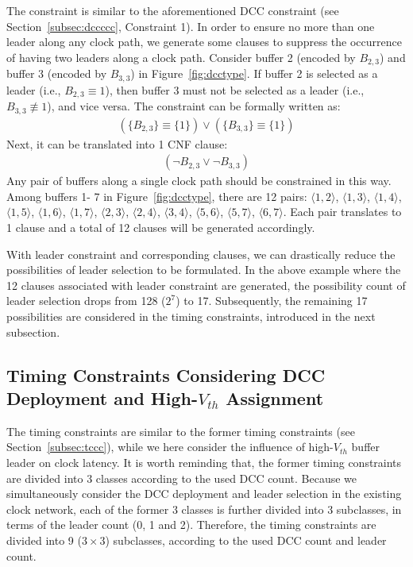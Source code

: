 The constraint is similar to the aforementioned DCC constraint (see Section~\ref{subsec:dccccc}, Constraint 1). In order to ensure no more than one leader along any clock path, we generate some clauses to suppress the occurrence of having two leaders along a clock path. Consider buffer 2 (encoded by {\fontsize{9}{10}$B_{2,3}$}) and buffer 3 (encoded by {\fontsize{9}{10}$B_{3,3}$}) in Figure~\ref{fig:dcctype}. If buffer 2 is selected as a leader (i.e., {\fontsize{9}{10}${B_{2,3}} \equiv {1}$}), then buffer 3 must not be selected as a leader (i.e., {\fontsize{9}{10}$B_{3,3} \not\equiv {1}$}), and vice versa. The constraint can be formally written as:
{\fontsize{9}{10}
\begin{gather*}
\left(\{B_{2,3}\} \equiv \{1\}\right) \lor \left(\{B_{3,3}\} \equiv \{1\}\right)
\end{gather*}}
Next, it can be translated into 1 CNF clause:
{\fontsize{9}{10}
\begin{equation*}
\begin{split}
(\neg B_{2,3}\lor\neg B_{3,3})
\end{split}
\end{equation*}}
Any pair of buffers along a single clock path should be constrained in this way. Among buffers 1- 7 in Figure~\ref{fig:dcctype}, there are 12 pairs: $\langle1, 2\rangle$, $\langle1, 3\rangle$, $\langle1, 4\rangle$, $\langle1, 5\rangle$, $\langle1, 6\rangle$, $\langle1, 7\rangle$, $\langle2, 3\rangle$, $\langle2, 4\rangle$, $\langle3, 4\rangle$, $\langle5, 6\rangle$, $\langle5, 7\rangle$, $\langle6, 7\rangle$. Each pair translates to 1 clause and a total of 12 clauses will be generated accordingly.

With leader constraint and corresponding clauses, we can drastically reduce the possibilities of leader selection to be formulated. In the above example where the 12 clauses associated with leader constraint are generated, the possibility count of leader selection drops from 128 ($2^7$) to 17. Subsequently, the remaining 17 possibilities are considered in the timing constraints, introduced in the next subsection.

\subsection{Timing Constraints Considering DCC Deployment and High-$V_{th}$ Assignment}
\label{sec:VTA:timing}
The timing constraints are similar to the former timing constraints (see Section~\ref{subsec:tccc}), while we here consider the influence of high-$V_{th}$ buffer leader on clock latency. It is worth reminding that, the former timing constraints are divided into 3 classes according to the used DCC count. Because we simultaneously consider the DCC deployment and leader selection in the existing clock network, each of the former 3 classes is further divided into 3 subclasses, in terms of the leader count (0, 1 and 2). Therefore, the timing constraints are divided into 9 ($3 \times 3$) subclasses, according to the used DCC count and leader count.

